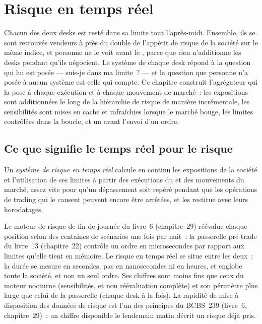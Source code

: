 \chapter{Risque en temps réel}\label{ch:pl:real-time-risk}

Chacun des deux desks est resté dans sa limite tout l'après-midi. Ensemble, ils se sont retrouvés vendeurs à près du double de l'appétit de risque de la société sur le même indice, et
personne ne le voit avant le , parce que rien n'additionne les desks pendant qu'ils négocient. Le système de chaque desk répond à la question
qui lui est posée --- suis-je dans ma limite~? --- et la question que personne n'a posée à aucun système est celle qui compte. Ce chapitre construit
l'agrégateur qui la pose à chaque exécution et à chaque mouvement de marché~: les expositions sont additionnées le long de la hiérarchie de risque de manière incrémentale, les sensibilités sont mises en cache et
rafraîchies lorsque le marché bouge, les limites contrôlées dans la boucle, et un  avant l'envoi d'un ordre.

\section{Ce que signifie le temps réel pour le risque}

\begin{definition}\label{def:pl:real-time-risk:system}
Un \emph{système de risque en temps réel} calcule en continu les expositions de la société et l'utilisation de ses limites à partir des
exécutions du  et des mouvements du marché, assez vite pour qu'un dépassement soit repéré pendant que les opérations de trading qui le causent peuvent encore être arrêtées, et
les restitue avec leurs horodatages.
\end{definition}

Le moteur de risque de fin de journée du livre~6 (chapitre~29) réévalue chaque position selon des centaines de scénarios une fois par nuit~; la passerelle pré-trade
du livre~13 (chapitre~22) contrôle un ordre en microsecondes par rapport aux limites qu'elle tient en mémoire. Le risque en temps réel se situe entre les deux~: la durée se mesure en secondes, pas en
nanosecondes ni en heures, et englobe toute la société, et non un seul ordre. Ses chiffres sont moins fins que ceux du moteur nocturne (sensibilités, et non
réévaluation complète) et son périmètre plus large que celui de la passerelle (chaque desk à la fois). La rapidité de mise à disposition des données de risque est l'un des principes du BCBS~239
(livre~6, chapitre~29)~: un chiffre disponible le lendemain matin décrit un risque déjà pris.


